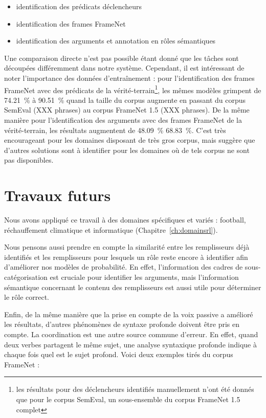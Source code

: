 \begin{itemize}
    \item identification des prédicats déclencheurs
    \item identification des frames FrameNet
    \item identification des arguments et annotation en rôles sémantiques 
\end{itemize}

Une comparaison directe n'est pas possible étant donné que les tâches sont
découpées différemment dans notre système. Cependant, il est intéressant de
noter l'importance des données d'entraînement : pour l'identification des
frames FrameNet avec des prédicats de la vérité-terrain\footnote{les résultats
pour des déclencheurs identifiés manuellement n'ont été donnés que pour le
corpus SemEval, un sous-ensemble du corpus FrameNet 1.5 complet}, les mêmes
modèles grimpent de 74.21~\% à 90.51~\% quand la taille du corpus augmente en
passant du corpus SemEval (XXX phrases) au corpus FrameNet 1.5 (XXX phrases).
De la même manière pour l'identification des arguments avec des frames FrameNet
de la vérité-terrain, les résultats augmentent de 48.09~\% 68.83~\%. C'est très
encourageant pour les domaines disposant de très gros corpus, mais suggère que
d'autres solutions sont à identifier pour les domaines où de tels corpus ne
sont pas disponibles.

\section{Travaux futurs}

Nous avons appliqué ce travail à des domaines spécifiques et variés : football,
réchauffement climatique et informatique (Chapitre~\ref{ch:domainsrl}).

Nous pensons aussi prendre en compte la similarité entre les remplisseurs déjà
identifiés et les remplisseurs pour lesquels un rôle reste encore à identifier
afin d'améliorer nos modèles de probabilité. En effet, l'information des cadres
de sous-catégorisation est cruciale pour identifier les arguments, mais
l'information sémantique concernant le contenu des remplisseurs est aussi utile
pour déterminer le rôle correct.

Enfin, de la même manière que la prise en compte de la voix passive a amélioré
les résultats, d'autres phénomènes de syntaxe profonde doivent être pris en
compte. La coordination est une autre source commune d'erreur. En effet, quand
deux verbes partagent le même sujet, une analyse syntaxique profonde indique à
chaque fois quel est le sujet profond. Voici deux exemples tirés du corpus
FrameNet :

